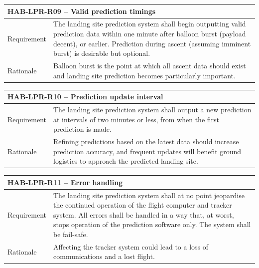 \documentclass[11pt]{article}
\begin{document}
\begin{table}[!h] \centering
 \begin{tabular}{|p{2cm} p{11cm}|}
 \hline
  \multicolumn{2}{|l|}{HAB-LPR-R09 – Valid prediction timings} \\
  \hline
  Requirement & The landing site prediction system shall begin outputting valid prediction data within one minute after balloon burst (payload decent), or earlier. Prediction during ascent (assuming imminent burst) is desirable but optional. \\
  \hline
  Rationale & Balloon burst is the point at which all ascent data should exist and landing site prediction becomes particularly important.   \\
  \hline
 \end{tabular}
\end{table}

\begin{table}[!h] \centering
 \begin{tabular}{|p{2cm} p{11cm}|}
 \hline
  \multicolumn{2}{|l|}{HAB-LPR-R10 – Prediction update interval} \\
  \hline
  Requirement & The landing site prediction system shall output a new prediction at intervals of two minutes or less, from when the first prediction is made. \\
  \hline
  Rationale & Refining predictions based on the latest data should increase prediction accuracy, and frequent updates will benefit ground logistics to approach the predicted landing site.  \\
  \hline
 \end{tabular}
\end{table}

\begin{table}[!h] \centering
 \begin{tabular}{|p{2cm} p{11cm}|}
 \hline
  \multicolumn{2}{|l|}{HAB-LPR-R11 – Error handling} \\
  \hline
  Requirement & The landing site prediction system shall at no point jeopardise the continued operation of the flight computer and tracker system. All errors shall be handled in a way that, at worst, stops operation of the prediction software only. The system shall be fail-safe.  \\
  \hline
  Rationale & Affecting the tracker system could lead to a loss of communications and a lost flight.  \\
  \hline
 \end{tabular}
\end{table}
\end{document}
